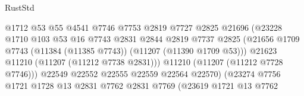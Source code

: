 \begin{lexlean}{RustStd}
\begin{coremodule}
                                            @1712
                                            @53
                                            @55
                                            @4541
                                            @7746
                                            @7753
                                            @2819
                                            @7727
                                            @2825
                                            @21696
                                            (@23228
                                              @1710
                                              @103
                                              @53
                                              @16
                                              @7743
                                              @2831
                                              @2844
                                              @2819
                                              @7737
                                              @2825
                                              (@21656
                                                @1709
                                                @7743
                                                (@11384 (@11385 @7743))
                                                (@11207 (@11390 @1709 @53)))
                                              @21623
                                              @11210
                                              (@11207 (@11212 @7738 @2831)))
                                            @11210
                                            (@11207 (@11212 @7728 @7746)))
                                          @22549
                                          @22552
                                          @22555
                                          @22559
                                          @22564
                                          @22570)
                                        (@23274
                                          @7756
                                          @1721
                                          @1728
                                          @13
                                          @2831
                                          @7762
                                          @2831
                                          @7769
                                          (@23619
                                            @1721
                                            @13
                                            @7762

\end{coremodule}
\end{lexlean}
